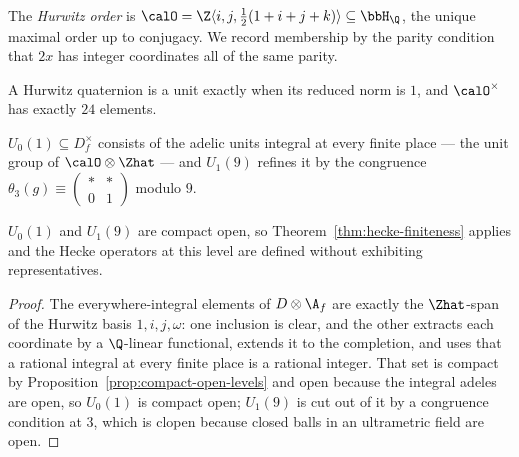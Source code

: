 
\begin{definition}
  \label{def:hurwitz}
  \leanok
  The \emph{Hurwitz order} is $\calO = \Z\langle i, j, \tfrac12(1+i+j+k)\rangle \subseteq \bbH_{\Q}$,
  the unique maximal order up to conjugacy.  We record membership by the parity condition that
  $2x$ has integer coordinates all of the same parity.
\end{definition}

\begin{proposition}
  \label{prop:hurwitz-units}
  \leanok
  A Hurwitz quaternion is a unit exactly when its reduced norm is $1$, and $\calO^\times$ has
  exactly $24$ elements.
\end{proposition}

\begin{definition}
  \label{def:jacobs-levels}
  \leanok
  $U_0(1) \subseteq D_f^\times$ consists of the adelic units integral at every finite place ---
  the unit group of $\calO \otimes \Zhat$ --- and $U_1(9)$ refines it by the congruence
  $\theta_3(g) \equiv \left(\begin{smallmatrix} * & * \\ 0 & 1\end{smallmatrix}\right)$ modulo
  $9$.
\end{definition}

\begin{proposition}
  \label{prop:jacobs-levels-compact-open}
  \leanok
  $U_0(1)$ and $U_1(9)$ are compact open, so Theorem~\ref{thm:hecke-finiteness} applies and the
  Hecke operators at this level are defined without exhibiting representatives.
\end{proposition}

\begin{proof}
  \leanok
  The everywhere-integral elements of $D \otimes \A_f$ are exactly the $\Zhat$-span of the
  Hurwitz basis $1, i, j, \omega$: one inclusion is clear, and the other extracts each coordinate
  by a $\Q$-linear functional, extends it to the completion, and uses that a rational integral at
  every finite place is a rational integer.  That set is compact by
  Proposition~\ref{prop:compact-open-levels} and open because the integral adeles are open, so
  $U_0(1)$ is compact open; $U_1(9)$ is cut out of it by a congruence condition at $3$, which is
  clopen because closed balls in an ultrametric field are open.
\end{proof}

